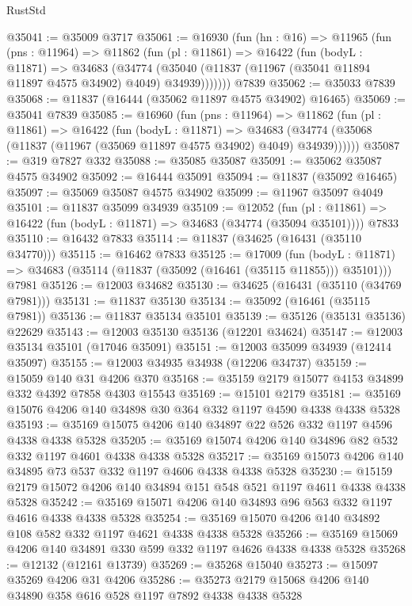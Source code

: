 \begin{lexlean}{RustStd}
\begin{coremodule}
@35041 := @35009 @3717
@35061 := @16930
    (fun (hn : @16) =>
    @11965
      (fun (pns : @11964) =>
      @11862
        (fun (pl : @11861) =>
        @16422
          (fun (bodyL : @11871) =>
          @34683
            (@34774 (@35040 (@11837 (@11967 (@35041 @11894 @11897 @4575 @34902) @4049) @34939)))))))
    @7839
@35062 := @35033 @7839
@35068 := @11837 (@16444 (@35062 @11897 @4575 @34902) @16465)
@35069 := @35041 @7839
@35085 := @16960
    (fun (pns : @11964) =>
    @11862
      (fun (pl : @11861) =>
      @16422
        (fun (bodyL : @11871) =>
        @34683 (@34774 (@35068 (@11837 (@11967 (@35069 @11897 @4575 @34902) @4049) @34939))))))
@35087 := @319 @7827 @332
@35088 := @35085 @35087
@35091 := @35062 @35087 @4575 @34902
@35092 := @16444 @35091
@35094 := @11837 (@35092 @16465)
@35097 := @35069 @35087 @4575 @34902
@35099 := @11967 @35097 @4049
@35101 := @11837 @35099 @34939
@35109 := @12052
    (fun (pl : @11861) => @16422 (fun (bodyL : @11871) => @34683 (@34774 (@35094 @35101))))
    @7833
@35110 := @16432 @7833
@35114 := @11837 (@34625 (@16431 (@35110 @34770)))
@35115 := @16462 @7833
@35125 := @17009
    (fun (bodyL : @11871) => @34683 (@35114 (@11837 (@35092 (@16461 (@35115 @11855))) @35101)))
    @7981
@35126 := @12003 @34682
@35130 := @34625 (@16431 (@35110 (@34769 @7981)))
@35131 := @11837 @35130
@35134 := @35092 (@16461 (@35115 @7981))
@35136 := @11837 @35134 @35101
@35139 := @35126 (@35131 @35136) @22629
@35143 := @12003 @35130 @35136 (@12201 @34624)
@35147 := @12003 @35134 @35101 (@17046 @35091)
@35151 := @12003 @35099 @34939 (@12414 @35097)
@35155 := @12003 @34935 @34938 (@12206 @34737)
@35159 := @15059 @140 @31 @4206 @370
@35168 := @35159 @2179 @15077 @4153 @34899 @332 @4392 @7858 @4303 @15543
@35169 := @15101 @2179
@35181 := @35169 @15076 @4206 @140 @34898 @30 @364 @332 @1197 @4590 @4338 @4338 @5328
@35193 := @35169 @15075 @4206 @140 @34897 @22 @526 @332 @1197 @4596 @4338 @4338 @5328
@35205 := @35169 @15074 @4206 @140 @34896 @82 @532 @332 @1197 @4601 @4338 @4338 @5328
@35217 := @35169 @15073 @4206 @140 @34895 @73 @537 @332 @1197 @4606 @4338 @4338 @5328
@35230 := @15159 @2179 @15072 @4206 @140 @34894 @151 @548 @521 @1197 @4611 @4338 @4338 @5328
@35242 := @35169 @15071 @4206 @140 @34893 @96 @563 @332 @1197 @4616 @4338 @4338 @5328
@35254 := @35169 @15070 @4206 @140 @34892 @108 @582 @332 @1197 @4621 @4338 @4338 @5328
@35266 := @35169 @15069 @4206 @140 @34891 @330 @599 @332 @1197 @4626 @4338 @4338 @5328
@35268 := @12132 (@12161 @13739)
@35269 := @35268 @15040
@35273 := @15097 @35269 @4206 @31 @4206
@35286 := @35273 @2179 @15068 @4206 @140 @34890 @358 @616 @528 @1197 @7892 @4338 @4338 @5328

\end{coremodule}
\end{lexlean}
